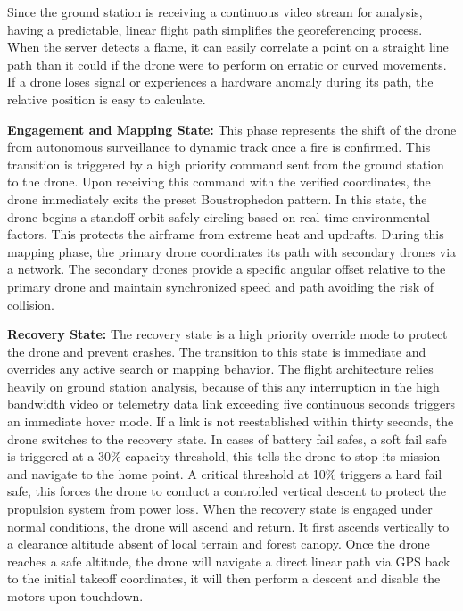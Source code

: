 \documentclass[journal, onecolumn]{IEEEtran}
\begin{document}
Since the ground station is receiving a continuous video stream for analysis, having a predictable, linear flight path simplifies the georeferencing process. When the server detects a flame, it can easily correlate a point on a straight line path than it could if the drone were to perform on erratic or curved movements. If a drone loses signal or experiences a hardware anomaly during its path, the relative position is easy to calculate. 

\vspace{0.5em}

\textbf{Engagement and Mapping State:} This phase represents the shift of the drone from autonomous surveillance to dynamic track once a fire is confirmed. This transition is triggered by a high priority command sent from the ground station to the drone. Upon receiving this command with the verified coordinates, the drone immediately exits the preset Boustrophedon pattern. In this state, the drone begins a standoff orbit safely circling based on real time environmental factors. This protects the airframe from extreme heat and updrafts. During this mapping phase, the primary drone coordinates its path with secondary drones via a network. The secondary drones provide a specific angular offset relative to the primary drone and maintain synchronized speed and path avoiding the risk of collision.

\vspace{0.5em}

\textbf{Recovery State:} The recovery state is a high priority override mode to protect the drone and prevent crashes. The transition to this state is immediate and overrides any active search or mapping behavior. The flight architecture relies heavily on ground station analysis, because of this any interruption in the high bandwidth video or telemetry data link exceeding five continuous seconds triggers an immediate hover mode. If a link is not reestablished within thirty seconds, the drone switches to the recovery state. In cases of battery fail safes, a soft fail safe is triggered at a 30\% capacity threshold, this tells the drone to stop its mission and navigate to the home point. A critical threshold at 10\% triggers a hard fail safe, this forces the drone to conduct a controlled vertical descent to protect the propulsion system from power loss. When the recovery state is engaged under normal conditions, the drone will ascend and return. It first ascends vertically to a clearance altitude absent of local terrain and forest canopy. Once the drone reaches a safe altitude, the drone will navigate a direct linear path via GPS back to the initial takeoff coordinates, it will then perform a descent and disable the motors upon touchdown.
\end{document}
